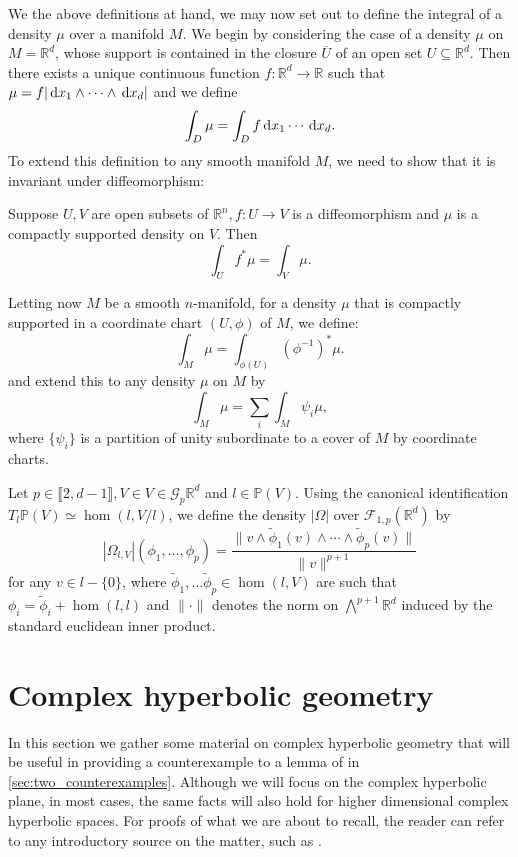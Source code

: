 \documentclass{report}
\begin{document}
We the above definitions at hand, we may now set out to define the integral of a density $\mu$ over a manifold $M$.
We begin by considering the case of a density $\mu$ on $M = \mathbb R^d$, whose support is contained in the closure $\overline{U}$ of an open set $U \subseteq \mathbb R^d$.
Then there exists a unique continuous function $f: \mathbb R^d \to \mathbb R$ such that $\mu = f |\,\mathrm{d} x_1 \wedge \cdots \wedge \,\mathrm{d} x_d|$ and we define
\[
\int_D \mu = \int_D f \,\mathrm{d} x_1 \cdots \,\mathrm{d} x_d.
\]
To extend this definition to any smooth manifold $M$, we need to show that it is invariant under diffeomorphism:
\begin{proposition}
    Suppose $U, V$ are open subsets of $\mathbb R^n, f: U \to V$ is a diffeomorphism and $\mu$ is a compactly supported density on $V$.
    Then
    \[
    \int_U f^*\mu = \int_V \mu.
    \]
\end{proposition}
Letting now $M$ be a smooth $n$-manifold, for a density $\mu$ that is compactly supported in a coordinate chart $(U, \phi)$ of $M$, we define:
\[
\int_M \mu = \int_{\phi(U)} (\phi^{-1})^*\mu.
\]
and extend this to any density $\mu$ on $M$ by
\[
\int_M \mu = \sum_{i} \int_M \psi_i \mu,
\]
where $\{\psi_i\}$ is a partition of unity subordinate to a cover of $M$ by coordinate charts.

\begin{example}
    Let $p \in \llbracket 2, d-1 \rrbracket, V \in V \in \mathcal G_{p}{\mathbb R^d}$ and $l \in \mathbb P(V)$.
        Using the canonical identification $T_l \mathbb P(V) \simeq \hom (l, V/l)$, we define the density $|\Omega|$ over $\mathcal F_{1, p}(\mathbb R^d)$ by
    \[
        |\Omega_{l,V}|(\phi_1, \ldots, \phi_p) = 
        \frac{\| v \wedge \tilde \phi_1(v) \wedge \cdots \wedge \tilde \phi_p (v) \|}{\|v\|^{p+1}}
    \]
    for any $v \in l - \{ 0\}$, where $\tilde \phi_1, \ldots \tilde \phi_p \in \hom(l, V)$ are such that $\phi_i = \tilde \phi_i + \hom(l, l)$ and $\| \cdot \|$ denotes the norm on $\bigwedge^{p+1} \mathbb R^d$ induced by the standard euclidean inner product.
\end{example}


\section{Complex hyperbolic geometry}\label{sec:complex_geometry}
In this section we gather some material on complex hyperbolic geometry that will be useful in providing a counterexample to a lemma of \cite{pozzetti_anosov_2023} in \cref{sec:two_counterexamples}.
Although we will focus on the complex hyperbolic plane, in most cases, the same facts will also hold for higher dimensional complex hyperbolic spaces.
For proofs of what we are about to recall, the reader can refer to any introductory source on the matter, such as \cite{parker2003notes}.
\end{document}
